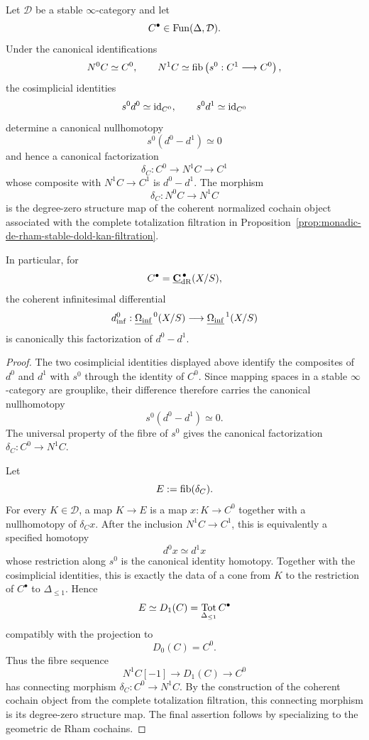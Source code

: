 \begin{proposition}
\label{prop:degree-zero-normalized-differential}
Let \(\mathcal D\) be a stable \(\infty\)-category and let
\[
    C^\bullet\in\operatorname{Fun}(\Delta,\mathcal D).
\]
Under the canonical identifications
\[
    N^0C\simeq C^0,
    \qquad
    N^1C\simeq\operatorname{fib}\left(s^0:C^1\longrightarrow C^0\right),
\]
the cosimplicial identities
\[
    s^0d^0\simeq\operatorname{id}_{C^0},
    \qquad
    s^0d^1\simeq\operatorname{id}_{C^0}
\]
determine a canonical nullhomotopy
\[
    s^0(d^0-d^1)\simeq0
\]
and hence a canonical factorization
\[
\boxed{
    \delta_C:
    C^0
    \longrightarrow
    N^1C
    \longrightarrow
    C^1
}
\]
whose composite with \(N^1C\to C^1\) is \(d^0-d^1\).  The morphism
\[
    \delta_C:N^0C\longrightarrow N^1C
\]
is the degree-zero structure map of the coherent normalized cochain object associated with the
complete totalization filtration in
Proposition~\ref{prop:monadic-de-rham-stable-dold-kan-filtration}.

In particular, for
\[
    C^\bullet
    =
    \underline{\mathbf C}_{\mathrm{dR}}^{\,\bullet}(X/S),
\]
the coherent infinitesimal differential
\[
    d_{\inf}^0:
    \underline{\Omega_{\mathrm{inf}}}^{\,0}(X/S)
    \longrightarrow
    \underline{\Omega_{\mathrm{inf}}}^{\,1}(X/S)
\]
is canonically this factorization of \(d^0-d^1\).
\end{proposition}

\begin{proof}
The two cosimplicial identities displayed above identify the composites of \(d^0\) and \(d^1\)
with \(s^0\) through the identity of \(C^0\).  Since mapping spaces in a stable
\(\infty\)-category are grouplike, their difference therefore carries the canonical nullhomotopy
\[
    s^0(d^0-d^1)\simeq0.
\]
The universal property of the fibre of \(s^0\) gives the canonical factorization
\(\delta_C:C^0\to N^1C\).

Let
\[
    E:=\operatorname{fib}(\delta_C).
\]
For every \(K\in\mathcal D\), a map \(K\to E\) is a map \(x:K\to C^0\) together with a
nullhomotopy of \(\delta_Cx\).  After the inclusion \(N^1C\to C^1\), this is equivalently a
specified homotopy
\[
    d^0x\simeq d^1x
\]
whose restriction along \(s^0\) is the canonical identity homotopy.  Together with the
cosimplicial identities, this is exactly the data of a cone from \(K\) to the restriction of
\(C^\bullet\) to \(\Delta_{\leq1}\).  Hence
\[
    E\simeq D_1(C)=\operatorname*{Tot}_{\Delta_{\leq1}}C^\bullet
\]
compatibly with the projection to
\[
    D_0(C)=C^0.
\]
Thus the fibre sequence
\[
    N^1C[-1]\longrightarrow D_1(C)\longrightarrow C^0
\]
has connecting morphism \(\delta_C:C^0\to N^1C\).  By the construction of the coherent cochain
object from the complete totalization filtration, this connecting morphism is its degree-zero
structure map.  The final assertion follows by specializing to the geometric de Rham cochains.
\end{proof}

